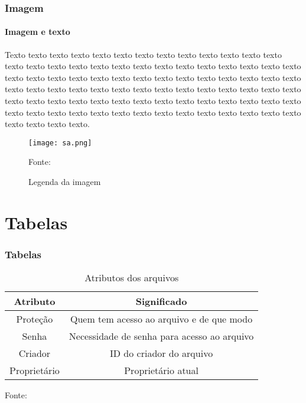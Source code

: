 	\begin{frame}
		\frametitle{Imagem}
		\framesubtitle{Imagem e texto}
		
		\begin{minipage}[H]{.5\textwidth}
			Texto texto texto texto texto texto texto texto texto texto texto texto texto texto texto texto texto texto texto texto texto texto texto texto texto texto texto texto texto texto texto texto texto texto texto texto texto texto texto texto texto texto texto texto texto texto texto texto texto texto texto texto texto texto texto texto texto texto texto texto texto texto texto texto texto texto texto texto texto texto texto texto texto texto texto texto texto texto texto texto texto texto texto texto texto texto texto.	
		\end{minipage}
		\hfill
		\begin{minipage}[H]{.45\textwidth}
			\begin{figure}
				\centering
				\caption{Legenda da imagem}
				
				\texttt{[image: sa.png]}
				
				\footnotesize{Fonte: }
				\label{figtextimg}
			\end{figure}  
		\end{minipage}
	\end{frame}
	
	\section{Tabelas}	
	\begin{frame}
		\frametitle{Tabelas}
				
		\begin{table}[H]
			\centering
			\caption{Atributos dos arquivos}
			\begin{tabular}{c|c}
				\toprule
				\textbf{Atributo} & \textbf{Significado} \\
				\midrule
				Prote\c{c}\~{a}o&Quem tem acesso ao arquivo e de que modo\\
				\midrule
				Senha&Necessidade de senha para acesso ao arquivo\\
				\midrule
				Criador&ID do criador do arquivo\\
				\midrule
				Propriet\'{a}rio&Propriet\'{a}rio atual\\
				\bottomrule
			\end{tabular}
			
			\label{tab:attI}
			\footnotesize{Fonte: \citeonline{tanebaun2010}}				
		\end{table}
	\end{frame}
	
